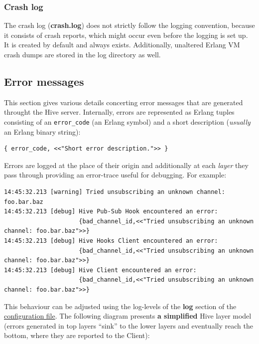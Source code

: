 \documentclass[a4paper]{article}
\begin{document}
\subsubsection{Crash log}
\label{sec-5-1-4}

The crash log (\textbf{crash.log}) does not strictly follow the logging convention, because it consists of crash reports, which might occur even before the logging is set up. It is created by default and always exists. Additionally, unaltered Erlang VM crash dumps are stored in the log directory as well.
\subsection{Error messages}
\label{sec-5-2}

This section gives various details concerting error messages that are generated throught the Hive server. Internally, errors are represented as Erlang tuples consisting of an \texttt{error\_code} (an Erlang symbol) and a short description (\emph{usually} an Erlang binary string):


\begin{verbatim}
{ error_code, <<"Short error description.">> }
\end{verbatim}




\noindent
Errors are logged at the place of their origin and additionally at each \emph{layer} they pass through providing an error-trace useful for debugging. For example:


\begin{verbatim}
14:45:32.213 [warning] Tried unsubscribing an unknown channel: foo.bar.baz
14:45:32.213 [debug] Hive Pub-Sub Hook encountered an error:
                     {bad_channel_id,<<"Tried unsubscribing an unknown channel: foo.bar.baz">>}
14:45:32.213 [debug] Hive Hooks Client encountered an error:
                     {bad_channel_id,<<"Tried unsubscribing an unknown channel: foo.bar.baz">>}
14:45:32.213 [debug] Hive Client encountered an error:
                     {bad_channel_id,<<"Tried unsubscribing an unknown channel: foo.bar.baz">>}
\end{verbatim}



\noindent
This behaviour can be adjusted using the log-levels of the \textbf{log} section of the \hyperref[sec-3-1-8]{configuration file}. The following diagram presents \textbf{a simplified} Hive layer model (errors generated in top layers ``sink'' to the lower layers and eventually reach the bottom, where they are reported to the Client):
\end{document}
